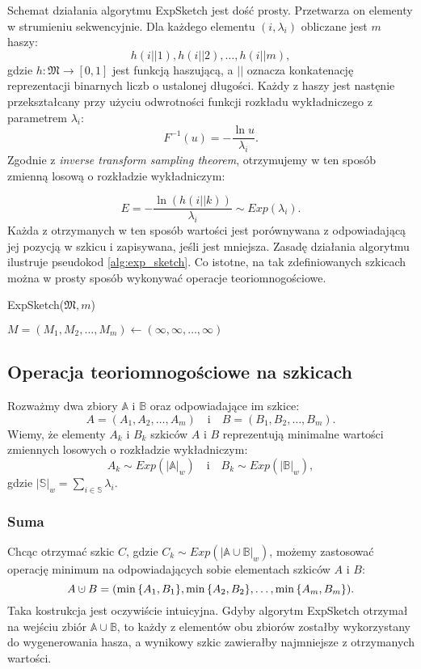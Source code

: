     Schemat działania algorytmu ExpSketch jest dość prosty. Przetwarza on elementy w strumieniu sekwencyjnie. Dla każdego elementu $(i, \lambda_{i})$ obliczane jest $m$ haszy:
    \[
        h(i || 1), h(i || 2), \dots, h(i || m),
    \]
    gdzie $h: \mathfrak{M} \rightarrow [0,1]$ jest funkcją haszującą, a $||$ oznacza konkatenację reprezentacji binarnych liczb o ustalonej długości. Każdy z haszy jest nastęnie przekształcany przy użyciu odwrotności funkcji rozkładu wykładniczego z parametrem $\lambda_i$:
    \[
        F^{-1}(u) = - \frac{\ln u}{\lambda_i}.
    \]
    Zgodnie z \textit{inverse transform sampling theorem}\cite{Devroye_1986}, otrzymujemy w ten sposób zmienną losową o rozkładzie wykładniczym:

    \[
        E = - \frac{\ln(h(i || k))}{\lambda_i} \sim Exp(\lambda_i).
    \]
    Każda z otrzymanych w ten sposób wartości jest porównywana z odpowiadającą jej pozycją w szkicu i zapisywana, jeśli jest mniejsza. Zasadę działania algorytmu ilustruje pseudokod \ref{alg:exp_sketch}. Co istotne, na tak zdefiniowanych szkicach można w prosty sposób wykonywać operacje teoriomnogościowe. 

    \begin{algorithm}
        \caption{ExpSketch($\mathfrak{M}, m$)}\label{alg:exp_sketch}
        $M = (M_1, M_2, \dots, M_m) \gets (\infty, \infty, \dots, \infty)$\;
    \end{algorithm}

\subsection{Operacja teoriomnogościowe na szkicach}
    Rozważmy dwa zbiory $\mathbb{A}$ i $\mathbb{B}$ oraz odpowiadające im szkice: 
    \[
        A = (A_1, A_2, \dots, A_m) \quad \text{i} \quad B = (B_1, B_2, \dots, B_m).  
    \]
    Wiemy, że elementy $A_k$ i $B_k$ szkiców $A$ i $B$ reprezentują minimalne wartości zmiennych losowych o rozkładzie wykładniczym:
    \[
        A_k \sim Exp(|\mathbb{A}|_{w}) \quad \text{i} \quad B_k \sim Exp(|\mathbb{B}|_{w}), 
    \]
    gdzie $|\mathbb{S}|_{w} = \sum\limits_{i \in \mathbb{S}}\lambda_i$. 
    \subsubsection*{Suma}
    Chcąc otrzymać szkic $C$, gdzie $C_k \sim Exp(|\mathbb{A} \cup \mathbb{B}|_{w})$, możemy zastosować operację minimum na odpowiadających sobie elementach szkiców $A$ i $B$:    
    \[
        A \mathbin{\mathaccent\cdot\cup} B = (\min{\{A_1, B_1\}}, \min{\{A_2, B_2\}}, \dots, \min{\{A_m, B_m\}}).
    \]
    Taka kostrukcja jest oczywiście intuicyjna. Gdyby algorytm ExpSketch otrzymał na wejściu zbiór $\mathbb{A} \cup \mathbb{B}$, to każdy z elementów obu zbiorów zostałby wykorzystany do wygenerowania hasza, a wynikowy szkic zawierałby najmniejsze z otrzymanych wartości.
    
